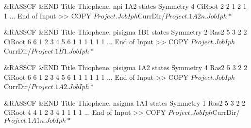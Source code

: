 \begin{inputlisting}
 &RASSCF &END
Title                                                                           
 Thiophene. npi  1A2 states
Symmetry                                                                        
    4                                                                          
CiRoot                                                                        
2 2                                                                           
1 2
1 1
...
End of Input                                                                    
>> COPY $Project.JobIph $CurrDir/$Project.1A2n.JobIph
*$
\end{inputlisting}

\begin{inputlisting}
 &RASSCF &END
Title                                                                           
 Thiophene. pisigma  1B1 states
Symmetry                                                                        
    2                                                                          
Ras2
    5    3    2    2
CiRoot                                                                        
6 6
1 2 3 4 5 6                                                                   
1 1 1 1 1 1
...
End of Input                                                                    
>> COPY $Project.JobIph $CurrDir/$Project.1B1.JobIph
*$
\end{inputlisting}

\begin{inputlisting}
 &RASSCF &END
Title                                                                           
 Thiophene. pisigma  1A2 states
Symmetry                                                                        
    4                                                                          
Ras2
    5    3    2    2
CiRoot                                                                        
6 6
1 2 3 4 5 6                                                                   
1 1 1 1 1 1
...
End of Input                                                                    
>> COPY $Project.JobIph $CurrDir/$Project.1A2.JobIph
*$
\end{inputlisting}

\begin{inputlisting}
 &RASSCF &END
Title                                                                           
 Thiophene. nsigma  1A1 states
Symmetry                                                                        
    1                                                                          
Ras2
    5    3    2    2
CiRoot                                                                        
4 4
1 2 3 4
1 1 1 1
...
End of Input                                                                    
>> COPY $Project.JobIph $CurrDir/$Project.1A1n.JobIph
*$
\end{inputlisting}

